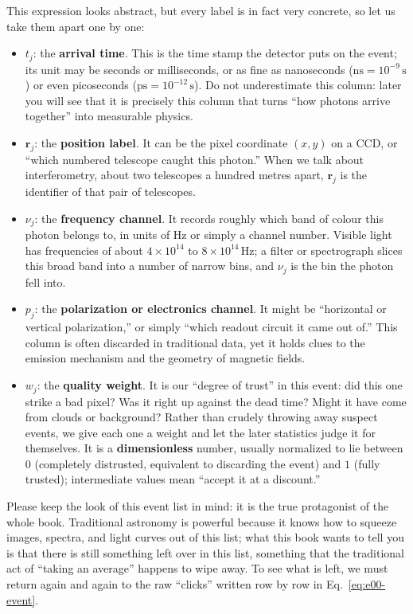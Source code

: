 This expression looks abstract, but every label is in fact very concrete, so let us take them apart one by one:

\begin{itemize}
  \item \(t_j\): the \textbf{arrival time}. This is the time stamp the detector puts on the event; its unit may be seconds or milliseconds, or as fine as nanoseconds (\(\mathrm{ns}=10^{-9}\,\mathrm{s}\)) or even picoseconds (\(\mathrm{ps}=10^{-12}\,\mathrm{s}\)). Do not underestimate this column: later you will see that it is precisely this column that turns ``how photons arrive together'' into measurable physics.
  \item \(\bm r_j\): the \textbf{position label}. It can be the pixel coordinate \((x,y)\) on a CCD, or ``which numbered telescope caught this photon.'' When we talk about interferometry, about two telescopes a hundred metres apart, \(\bm r_j\) is the identifier of that pair of telescopes.
  \item \(\nu_j\): the \textbf{frequency channel}. It records roughly which band of colour this photon belongs to, in units of Hz or simply a channel number. Visible light has frequencies of about \(4\times10^{14}\) to \(8\times10^{14}\,\mathrm{Hz}\); a filter or spectrograph slices this broad band into a number of narrow bins, and \(\nu_j\) is the bin the photon fell into.
  \item \(p_j\): the \textbf{polarization or electronics channel}. It might be ``horizontal or vertical polarization,'' or simply ``which readout circuit it came out of.'' This column is often discarded in traditional data, yet it holds clues to the emission mechanism and the geometry of magnetic fields.
  \item \(w_j\): the \textbf{quality weight}. It is our ``degree of trust'' in this event: did this one strike a bad pixel? Was it right up against the dead time? Might it have come from clouds or background? Rather than crudely throwing away suspect events, we give each one a weight and let the later statistics judge it for themselves. It is a \textbf{dimensionless} number, usually normalized to lie between \(0\) (completely distrusted, equivalent to discarding the event) and \(1\) (fully trusted); intermediate values mean ``accept it at a discount.''
\end{itemize}

Please keep the look of this event list in mind: it is the true protagonist of the whole book. Traditional astronomy is powerful because it knows how to squeeze images, spectra, and light curves out of this list; what this book wants to tell you is that there is still something left over in this list, something that the traditional act of ``taking an average'' happens to wipe away. To see what is left, we must return again and again to the raw ``clicks'' written row by row in Eq.~\eqref{eq:e00-event}.

